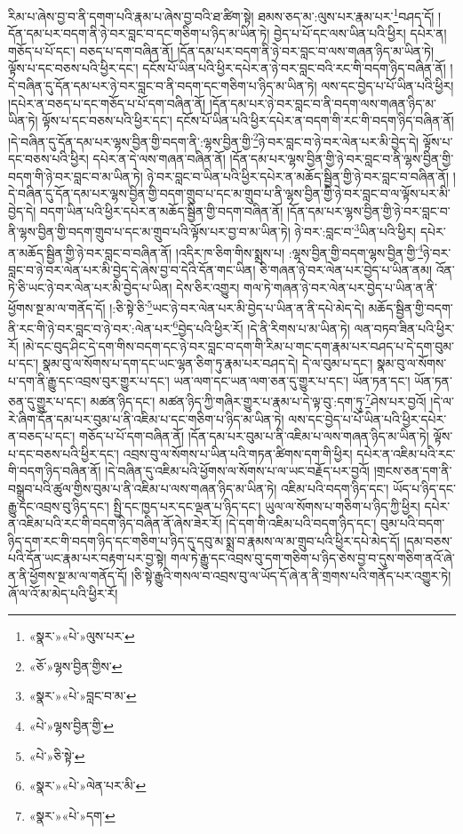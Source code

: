 རིམ་པ་ཞེས་བྱ་བ་ནི་དགག་པའི་རྣམ་པ་ཞེས་བྱ་བའི་ཐ་ཚིག་སྟེ། ཐམས་ཅད་མ་:ལུས་པར་རྣམ་པར་\footnote{«སྣར་»«པེ་»ལུས་པར་}བཤད་དོ། །དོན་དམ་པར་བདག་ནི་ཉེ་བར་བླང་བ་དང་གཅིག་པ་ཉིད་མ་ཡིན་ཏེ། བྱེད་པ་པོ་དང་ལས་ཡིན་པའི་ཕྱིར། དཔེར་ན། གཅོད་པ་པོ་དང་། བཅད་པ་དག་བཞིན་ནོ། །དོན་དམ་པར་བདག་ནི་ཉེ་བར་བླང་བ་ལས་གཞན་ཉིད་མ་ཡིན་ཏེ། ལྟོས་པ་དང་བཅས་པའི་ཕྱིར་དང་། དངོས་པོ་ཡིན་པའི་ཕྱིར་དཔེར་ན་ཉེ་བར་བླང་བའི་རང་གི་བདག་ཉིད་བཞིན་ནོ། །དེ་བཞིན་དུ་དོན་དམ་པར་ཉེ་བར་བླང་བ་ནི་བདག་དང་གཅིག་པ་ཉིད་མ་ཡིན་ཏེ། ལས་དང་བྱེད་པ་པོ་ཡིན་པའི་ཕྱིར། །དཔེར་ན་བཅད་པ་དང་གཅོད་པ་པོ་དག་བཞིན་ནོ། །དོན་དམ་པར་ཉེ་བར་བླང་བ་ནི་བདག་ལས་གཞན་ཉིད་མ་ཡིན་ཏེ། ལྟོས་པ་དང་བཅས་པའི་ཕྱིར་དང་། དངོས་པོ་ཡིན་པའི་ཕྱིར་དཔེར་ན་བདག་གི་རང་གི་བདག་ཉིད་བཞིན་ནོ། །དེ་བཞིན་དུ་དོན་དམ་པར་ལྷས་བྱིན་གྱི་བདག་ནི་:ལྷས་བྱིན་གྱི་\footnote{«ཅོ་»ལྷས་བྱིན་གྱིས་}ཉེ་བར་བླང་བ་ཉེ་བར་ལེན་པར་མི་བྱེད་དེ། ལྟོས་པ་དང་བཅས་པའི་ཕྱིར། དཔེར་ན་དེ་ལས་གཞན་བཞིན་ནོ། །དོན་དམ་པར་ལྷས་བྱིན་གྱི་ཉེ་བར་བླང་བ་ནི་ལྷས་བྱིན་གྱི་བདག་གི་ཉེ་བར་བླང་བ་མ་ཡིན་ཏེ། ཉེ་བར་བླང་བ་ཡིན་པའི་ཕྱིར་དཔེར་ན་མཆོད་སྦྱིན་གྱི་ཉེ་བར་བླང་བ་བཞིན་ནོ། །དེ་བཞིན་དུ་དོན་དམ་པར་ལྷས་བྱིན་གྱི་བདག་གྲུབ་པ་དང་མ་གྲུབ་པ་ནི་ལྷས་བྱིན་གྱི་ཉེ་བར་བླང་བ་ལ་ལྟོས་པར་མི་བྱེད་དེ། བདག་ཡིན་པའི་ཕྱིར་དཔེར་ན་མཆོད་སྦྱིན་གྱི་བདག་བཞིན་ནོ། །དོན་དམ་པར་ལྷས་བྱིན་གྱི་ཉེ་བར་བླང་བ་ནི་ལྷས་བྱིན་གྱི་བདག་གྲུབ་པ་དང་མ་གྲུབ་པའི་ལྟོས་པར་བྱ་བ་མ་ཡིན་ཏེ། ཉེ་བར་:བླང་བ་\footnote{«སྣར་»«པེ་»བླང་བ་མ་}ཡིན་པའི་ཕྱིར། དཔེར་ན་མཆོད་སྦྱིན་གྱི་ཉེ་བར་བླང་བ་བཞིན་ནོ། །འདིར་ཁ་ཅིག་གིས་སྨྲས་པ། :ལྷས་བྱིན་གྱི་བདག་ལྷས་བྱིན་གྱི་\footnote{«པེ་»ལྷས་བྱིན་གྱི་}ཉེ་བར་བླང་བ་ཉེ་བར་ལེན་པར་མི་བྱེད་དེ་ཞེས་བྱ་བ་དེའི་དོན་གང་ཡིན། ཅི་གཞན་ཉེ་བར་ལེན་པར་བྱེད་པ་ཡིན་ནམ། འོན་ཏེ་ཅི་ཡང་ཉེ་བར་ལེན་པར་མི་བྱེད་པ་ཡིན། དེས་ཅིར་འགྱུར། གལ་ཏེ་གཞན་ཉེ་བར་ལེན་པར་བྱེད་པ་ཡིན་ན་ནི་ཕྱོགས་སྔ་མ་ལ་གནོད་དོ། །:ཅི་སྟེ་ཅི་\footnote{«པེ་»ཅི་སྟེ་}ཡང་ཉེ་བར་ལེན་པར་མི་བྱེད་པ་ཡིན་ན་ནི་དཔེ་མེད་དེ། མཆོད་སྦྱིན་གྱི་བདག་ནི་རང་གི་ཉེ་བར་བླང་བ་ཉེ་བར་:ལེན་པར་\footnote{«སྣར་»«པེ་»ལེན་པར་མི་}བྱེད་པའི་ཕྱིར་རོ། །དེ་ནི་རིགས་པ་མ་ཡིན་ཏེ། ལན་བཏབ་ཟིན་པའི་ཕྱིར་རོ། །མེ་དང་བུད་ཤིང་དེ་དག་གིས་བདག་དང་ཉེ་བར་བླང་བ་དག་གི་རིམ་པ་གང་དག་རྣམ་པར་བཤད་པ་དེ་དག་བུམ་པ་དང་། སྣམ་བུ་ལ་སོགས་པ་དག་དང་ཡང་ལྷན་ཅིག་ཏུ་རྣམ་པར་བཤད་དེ། དེ་ལ་བུམ་པ་དང་། སྣམ་བུ་ལ་སོགས་པ་དག་ནི་རྒྱུ་དང་འབྲས་བུར་གྱུར་པ་དང་། ཡན་ལག་དང་ཡན་ལག་ཅན་དུ་གྱུར་པ་དང་། ཡོན་ཏན་དང་། ཡོན་ཏན་ཅན་དུ་གྱུར་པ་དང་། མཚན་ཉིད་དང་། མཚན་ཉིད་ཀྱི་གཞིར་གྱུར་པ་རྣམ་པ་དེ་ལྟ་བུ་:དག་ཏུ་\footnote{«སྣར་»«པེ་»དག་}ཤེས་པར་བྱའོ། །དེ་ལ་རེ་ཞིག་དོན་དམ་པར་བུམ་པ་ནི་འཇིམ་པ་དང་གཅིག་པ་ཉིད་མ་ཡིན་ཏེ། ལས་དང་བྱེད་པ་པོ་ཡིན་པའི་ཕྱིར་དཔེར་ན་བཅད་པ་དང་། གཅོད་པ་པོ་དག་བཞིན་ནོ། །དོན་དམ་པར་བུམ་པ་ནི་འཇིམ་པ་ལས་གཞན་ཉིད་མ་ཡིན་ཏེ། ལྟོས་པ་དང་བཅས་པའི་ཕྱིར་དང་། འབྲས་བུ་ལ་སོགས་པ་ཡིན་པའི་གཏན་ཚིགས་དག་གི་ཕྱིར། དཔེར་ན་འཇིམ་པའི་རང་གི་བདག་ཉིད་བཞིན་ནོ། །དེ་བཞིན་དུ་འཇིམ་པའི་ཕྱོགས་ལ་སོགས་པ་ལ་ཡང་བརྗོད་པར་བྱའོ། །གྲངས་ཅན་དག་ནི་བསྒྲུབ་པའི་ཚུལ་གྱིས་བུམ་པ་ནི་འཇིམ་པ་ལས་གཞན་ཉིད་མ་ཡིན་ཏེ། འཇིམ་པའི་བདག་ཉིད་དང་། ཡོད་པ་ཉིད་དང་རྒྱུ་དང་འབྲས་བུ་ཉིད་དང་། སྤྱི་དང་ཁྱད་པར་དང་ལྡན་པ་ཉིད་དང་། ཡུལ་ལ་སོགས་པ་གཅིག་པ་ཉིད་ཀྱི་ཕྱིར། དཔེར་ན་འཇིམ་པའི་རང་གི་བདག་ཉིད་བཞིན་ནོ་ཞེས་ཟེར་རོ། །དེ་དག་གི་འཇིམ་པའི་བདག་ཉིད་དང་། བུམ་པའི་བདག་ཉིད་དག་རང་གི་བདག་ཉིད་དང་གཅིག་པ་ཉིད་དུ་དབུ་མ་སྨྲ་བ་རྣམས་ལ་མ་གྲུབ་པའི་ཕྱིར་དཔེ་མེད་དོ། །དམ་བཅས་པའི་དོན་ཡང་རྣམ་པར་བརྟག་པར་བྱ་སྟེ། གལ་ཏེ་རྒྱུ་དང་འབྲས་བུ་དག་གཅིག་པ་ཉིད་ཅེས་བྱ་བ་དུས་གཅིག་ནའོ་ཞེ་ན་ནི་ཕྱོགས་སྔ་མ་ལ་གནོད་དོ། །ཅི་སྟེ་རྒྱུའི་གསལ་བ་འབྲས་བུ་ལ་ཡོད་དོ་ཞེ་ན་ནི་གྲགས་པའི་གནོད་པར་འགྱུར་ཏེ། ཞོ་ལ་འོ་མ་མེད་པའི་ཕྱིར་རོ། 